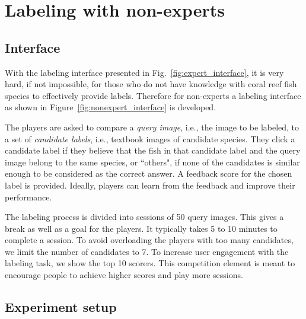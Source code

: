 \section{Labeling with non-experts}
\label{sec:nonexpt_label}


\subsection{Interface}
With the labeling interface presented in Fig.~\ref{fig:expert_interface},
it is very hard, if not impossible, for those who do not have knowledge with coral reef fish species to effectively provide labels. Therefore for non-experts a labeling interface as shown in Figure~\ref{fig:nonexpert_interface} is developed. 

The players are asked to compare a \textit{query image}, i.e., the image to be labeled, to  
a set of \textit{candidate labels}, i.e., textbook images of candidate species. 
They click a candidate label if they believe that the fish in that candidate label
and the query image belong to the same species, or ``others",  if none of the candidates is similar enough to be considered as the correct answer. 
%
A feedback score for the chosen label is provided. 
Ideally, players can learn from the feedback and improve their performance. 

%
The labeling process is divided into sessions of 50 query images. 
This gives a break as well as a goal for the players.  
It typically takes 5 to 10 minutes to complete a session. 
%
To avoid overloading the players with too many candidates, we limit the number of candidates to 7. 
%
To increase user engagement with the labeling task, we show the top 10 scorers. 
This competition element is meant to encourage people to achieve higher scores and play more sessions. 

\subsection{Experiment setup}
\label{subsec:nonexpt_exp}


